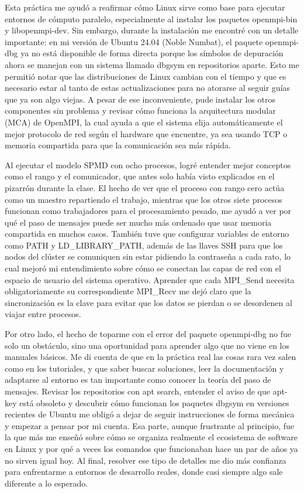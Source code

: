 Esta práctica me ayudó a reafirmar cómo Linux sirve como base para ejecutar entornos de cómputo paralelo, especialmente al instalar los paquetes 
openmpi-bin y libopenmpi-dev. Sin embargo, durante la instalación me encontré con un detalle importante: en mi versión de Ubuntu 24.04 (Noble Numbat), 
el paquete openmpi-dbg ya no está disponible de forma directa porque los símbolos de depuración ahora se manejan con un sistema llamado dbgsym en 
repositorios aparte. Esto me permitió notar que las distribuciones de Linux cambian con el tiempo y que es necesario estar al tanto de estas 
actualizaciones para no atorarse al seguir guías que ya son algo viejas. A pesar de ese inconveniente, pude instalar los otros componentes sin 
problema y revisar cómo funciona la arquitectura modular (MCA) de OpenMPI, la cual ayuda a que el sistema elija automáticamente el mejor protocolo 
de red según el hardware que encuentre, ya sea usando TCP o memoria compartida para que la comunicación sea más rápida.

Al ejecutar el modelo SPMD con ocho procesos, logré entender mejor conceptos como el rango y el comunicador, que antes solo había visto explicados en 
el pizarrón durante la clase. El hecho de ver que el proceso con rango cero actúa como un maestro repartiendo el trabajo, mientras que los otros siete 
procesos funcionan como trabajadores para el procesamiento pesado, me ayudó a ver por qué el paso de mensajes puede ser mucho más ordenado que usar 
memoria compartida en muchos casos. También tuve que configurar variables de entorno como PATH y LD\_LIBRARY\_PATH, además de las llaves SSH para que 
los nodos del clúster se comuniquen sin estar pidiendo la contraseña a cada rato, lo cual mejoró mi entendimiento sobre cómo se conectan las capas 
de red con el espacio de usuario del sistema operativo. Aprender que cada MPI\_Send necesita obligatoriamente su correspondiente MPI\_Recv me dejó claro 
que la sincronización es la clave para evitar que los datos se pierdan o se desordenen al viajar entre procesos.

Por otro lado, el hecho de toparme con el error del paquete openmpi-dbg no fue solo un obstáculo, sino una oportunidad para aprender algo que no viene en los manuales básicos. Me di cuenta de que en la práctica real las cosas rara vez salen como en los tutoriales, y que saber buscar soluciones, leer la documentación y adaptarse al entorno es tan importante como conocer la teoría del paso de mensajes. Revisar los repositorios con apt search, entender el aviso de que apt-key está obsoleto y descubrir cómo funcionan los paquetes dbgsym en versiones recientes de Ubuntu me obligó a dejar de seguir instrucciones de forma mecánica y empezar a pensar por mi cuenta. Esa parte, aunque frustrante al principio, fue la que más me enseñó sobre cómo se organiza realmente el ecosistema de software en Linux y por qué a veces los comandos que funcionaban hace un par de años ya no sirven igual hoy. Al final, resolver ese tipo de detalles me dio más confianza para enfrentarme a entornos de desarrollo reales, donde casi siempre algo sale diferente a lo esperado.

